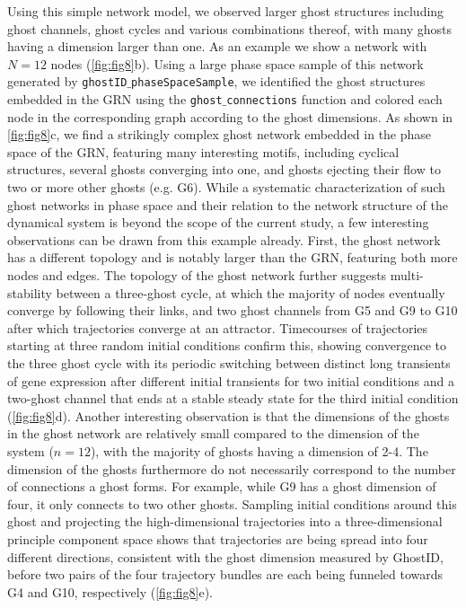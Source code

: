\documentclass{article}
\theoremstyle{definition}
\begin{document}
\begin{refsection}
Using this simple network model, we observed larger ghost structures including ghost channels, ghost cycles and various combinations thereof, with many ghosts having a dimension larger than one. As an example we show a network with $N=12$ nodes (\autoref{fig:fig8}b). Using a large phase space sample of this network generated by {\tt ghostID$\_$phaseSpaceSample}, we identified the ghost structures embedded in the GRN using the {\tt ghost$\_$connections} function and colored each node in the corresponding graph according to the ghost dimensions. As shown in \autoref{fig:fig8}c, we find a strikingly complex ghost network embedded in the phase space of the GRN, featuring many interesting motifs, including cyclical structures, several ghosts converging into one, and ghosts ejecting their flow to two or more other ghosts (e.g. G6). While a systematic characterization of such ghost networks in phase space and their relation to the network structure of the dynamical system is beyond the scope of the current study, a few interesting observations can be drawn from this example already. First, the ghost network has a different topology and is notably larger than the GRN, featuring both more nodes and edges. The topology of the ghost network further suggests multi-stability between a three-ghost cycle, at which the majority of nodes eventually converge by following their links, and two ghost channels from G5 and G9 to G10 after which trajectories converge at an attractor. Timecourses of trajectories starting at three random initial conditions confirm this, showing convergence to the three ghost cycle with its periodic switching between distinct long transients of gene expression after different initial transients for two initial conditions and a two-ghost channel that ends at a stable steady state for the third initial condition (\autoref{fig:fig8}d). Another interesting observation is that the dimensions of the ghosts in the ghost network are relatively small compared to the dimension of the system ($n=12$), with the majority of ghosts having a dimension of 2-4. The dimension of the ghosts furthermore do not necessarily correspond to the number of connections a ghost forms. For example, while G9 has a ghost dimension of four, it only connects to two other ghosts. Sampling initial conditions around this ghost and projecting the high-dimensional trajectories into a three-dimensional principle component space shows that trajectories are being spread into four different directions, consistent with the ghost dimension measured by GhostID, before two pairs of the four trajectory bundles are each being funneled towards G4 and G10, respectively (\autoref{fig:fig8}e).


\end{refsection}
\end{document}
